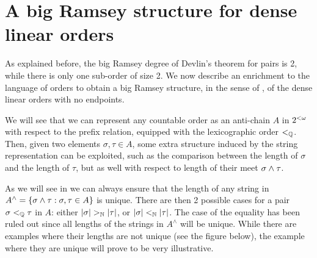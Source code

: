 
\section{A big Ramsey structure for dense linear orders}

As explained before, the big Ramsey degree of Devlin's theorem for pairs is 2, while there is only one sub-order of size 2. We now describe an enrichment to the language of orders to
obtain a big Ramsey structure, in the sense of , of the dense linear orders with no endpoints.

We will see that we can represent any countable order as an anti-chain $A$ in ${2^{<\omega}}$ with respect to the prefix relation, equipped with the lexicographic order $\ltlex$. \index{$\ltlex$} Then, given two elements $\sigma, \tau \in A$, some extra structure induced by the string representation can be exploited, such as the comparison between the length of $\sigma$ and the length of $\tau$, but as well with respect to length of their meet $\sigma \wedge \tau$. 


As we will see in  we can always ensure that the length of any string in $A^\wedge = \{ \sigma \wedge \tau: \sigma, \tau \in A \}$ is unique. There are then 2 possible cases for a pair  $\sigma <_{\mathbb{Q}} \tau$ in $A$: either $|\sigma| >_{\mathbb{N}} |\tau|$, or $|\sigma| <_{\mathbb{N}} |\tau|$. The case of the equality has been ruled out since all lengths of the strings in $A^\wedge$ will be unique. While there are examples where their lengths are not unique (see the figure below), the example where they are unique will prove to be very illustrative. 

